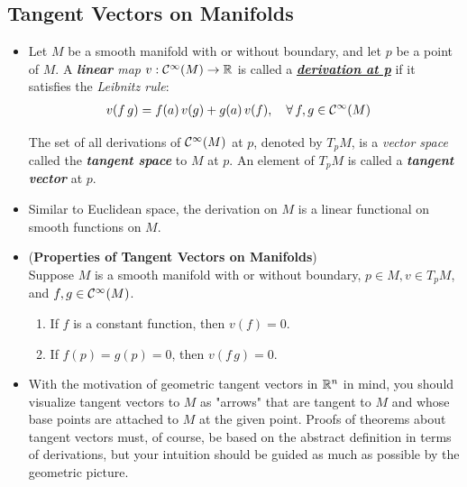 \documentclass[11pt]{article}
\begin{document}
\subsection{Tangent Vectors on Manifolds}
\begin{itemize}
\item 
\begin{definition}
Let $M$ be a smooth manifold with or without boundary, and let $p$ be a point of $M$. A \emph{\textbf{linear} map} $v: {\mathcal C}^{\infty}(M) \rightarrow {\mathbb R}$ is called a \underline{\textbf{\emph{derivation at p}}} if it satisfies the \emph{Leibnitz rule}:
\begin{align}
v(f\,g) &= f(a)\,v(g) + g(a)\,v(f), \quad \forall\,f,g \in {\mathcal C}^{\infty}(M)  \label{eqn: derivation_def_man}
\end{align}

The set of all derivations of ${\mathcal C}^{\infty}(M)$ at $p$, denoted by $T_{p}M$, is a \emph{vector space} called the \emph{\textbf{tangent space}} to $M$ at $p$. An element of $T_{p}M$ is called a \emph{\textbf{tangent vector}} at $p$.
\end{definition}

\item Similar to Euclidean space, the derivation on $M$ is a linear functional on smooth functions on $M$.

\item \begin{lemma} (\textbf{Properties of Tangent Vectors on Manifolds})\\
Suppose $M$ is a smooth manifold with or without boundary, $p \in M, v \in T_{p}M$, and $f, g \in {\mathcal C}^{\infty}(M)$. 
\begin{enumerate}
\item If $f$ is a constant function, then $v(f) = 0$. 
\item If $f(p) = g(p) = 0$, then $v(f\,g) = 0$.
\end{enumerate}
\end{lemma}

\item With the motivation of geometric tangent vectors in ${\mathbb R}^n$ in mind, you should visualize tangent vectors to $M$ as "arrows" that are tangent to $M$ and whose base points are attached to $M$ at the given point. Proofs of theorems about tangent vectors must, of course, be based on the abstract definition in terms of derivations, but your intuition should be guided as much as possible by the geometric picture.
\end{itemize}
\end{document}
